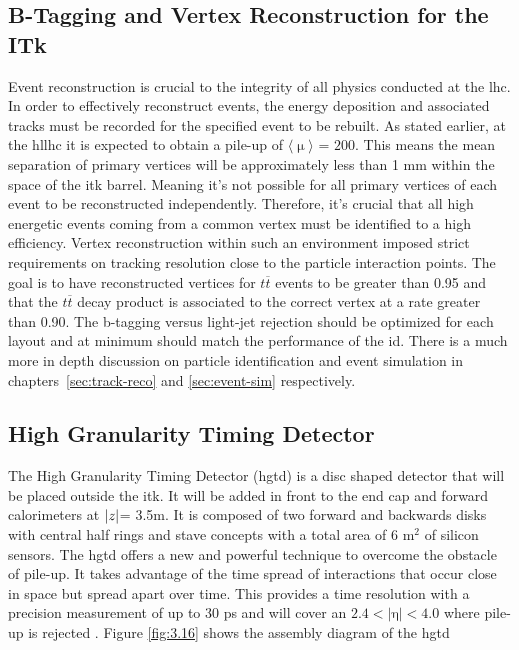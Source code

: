 \subsection{B-Tagging and Vertex Reconstruction for the ITk}

Event reconstruction is crucial to the integrity of all physics conducted at the \gls{lhc}. In order to effectively reconstruct events, the energy deposition and associated 
tracks must be recorded for the specified event to be rebuilt. As stated earlier, at the \gls{hllhc} it is expected to obtain a pile-up of $\langle \upmu \rangle$ = $\textrm{200}$.
This means the mean separation of primary vertices will be approximately less than 1 mm within the space of the \gls{itk} barrel. Meaning it's not possible for all primary 
vertices of each event to be reconstructed independently. Therefore, it's crucial that all high energetic events coming from a common vertex must be identified to a 
high efficiency. Vertex reconstruction within such an environment imposed strict requirements on tracking resolution close to the particle interaction points. The goal 
is to have reconstructed vertices for $t\overbar{t}$ events to be greater than 0.95 and that the $t\overbar{t}$ decay product is associated to the correct vertex 
at a rate greater than 0.90. The b-tagging versus light-jet rejection should be optimized for each layout and at minimum should match the performance of the \gls{id}.
There is a much more in depth discussion on particle identification and event simulation in chapters~\ref{sec:track-reco} and \ref{sec:event-sim} respectively. 

\subsection{High Granularity Timing Detector}\label{sec:hgtd}

The High Granularity Timing Detector (\gls{hgtd}) is a disc shaped detector that will be placed outside the \gls{itk}. It will be added in front to the end cap and forward calorimeters at 
$|\textrm{\textit{z}}|$= 3.5m. It is composed of two forward and backwards disks with central half rings and stave concepts with a total area of 6 $\textrm{m}^{\textrm{2}}$ of silicon sensors.
The \gls{hgtd} offers a new and powerful technique to overcome the obstacle of pile-up. It takes advantage of the time spread of interactions that occur close in space but spread apart over time. 
This provides a time resolution with a precision measurement of up to 30 ps and will cover an $\textrm{2.4} < |\textrm{η}| < \textrm{4.0}$ where pile-up is rejected \cite{hgtd}.
Figure \ref{fig:3.16} shows the assembly diagram of the \gls{hgtd}

